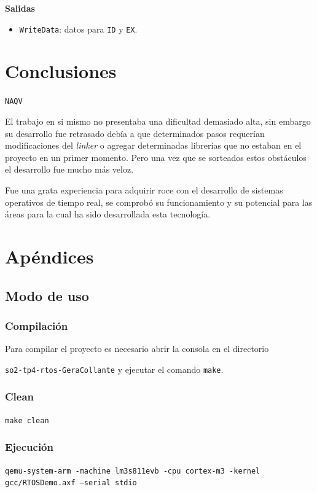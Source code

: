 \documentclass[a4paper]{article}
\begin{document}
\textbf{Salidas}
\begin{itemize}
	\item \texttt{WriteData}: datos para \texttt{ID} y \texttt{EX}.
\end{itemize}

\section{Conclusiones}

\texttt{NAQV}

El trabajo en si mismo no presentaba una dificultad demasiado alta, sin embargo su desarrollo fue retrasado debía a que determinados pasos requerían modificaciones del \textit{linker} o agregar determinadas librerías que no estaban en el proyecto en un primer momento. Pero una vez que se sorteados estos obstáculos el desarrollo fue mucho más veloz.

Fue una grata experiencia para adquirir roce con el desarrollo de sistemas operativos de tiempo real, se comprobó su funcionamiento y su potencial para las áreas para la cual ha sido desarrollada esta tecnología.

\section{Apéndices}

\subsection{Modo de uso}

\subsubsection{Compilación}
Para compilar el proyecto es necesario abrir la consola en el directorio 

\texttt{so2-tp4-rtos-GeraCollante} y ejecutar el comando \texttt{make}.

\subsubsection{Clean}
\texttt{make clean}

\subsubsection{Ejecución}
\texttt{qemu-system-arm -machine lm3s811evb -cpu cortex-m3 -kernel gcc/RTOSDemo.axf --serial stdio}

\clearpage

\nocite{*}
\end{document}
